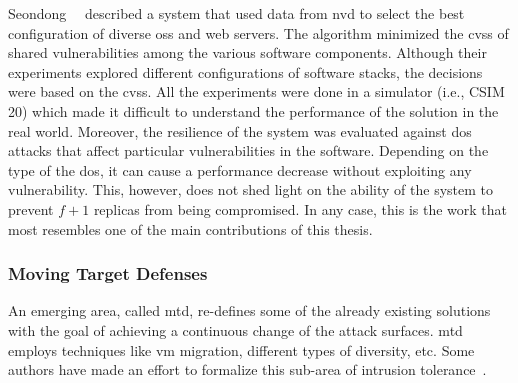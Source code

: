 Seondong~\etal{}~\cite{Seondong:2017} described a system that used data from \gls{nvd} to select the best configuration of diverse \glspl{os} and web servers.
The algorithm minimized the \gls{cvss} of shared vulnerabilities among the various software components.
Although their experiments explored different configurations of software stacks, the decisions were based on the \gls{cvss}.
All the experiments were done in a simulator (i.e., CSIM 20) which made it difficult to understand the performance of the solution in the real world.
Moreover, the resilience of the system was evaluated against \gls{dos} attacks that affect particular vulnerabilities in the software.
Depending on the type of the \gls{dos}, it can cause a performance decrease without exploiting any vulnerability.
This, however, does not shed light on the ability of the system to prevent $f+1$ replicas from being compromised.
In any case, this is the work that most resembles one of the main contributions of this thesis. 


\subsubsection{Moving Target Defenses} 
An emerging area, called \gls{mtd}, re-defines some of the already existing solutions with the goal of achieving a continuous change of the attack surfaces. 
\gls{mtd} employs techniques like \gls{vm} migration, different types of diversity, etc.
Some authors have made an effort to formalize this sub-area of intrusion tolerance~\cite{Zhuang:2014}.

